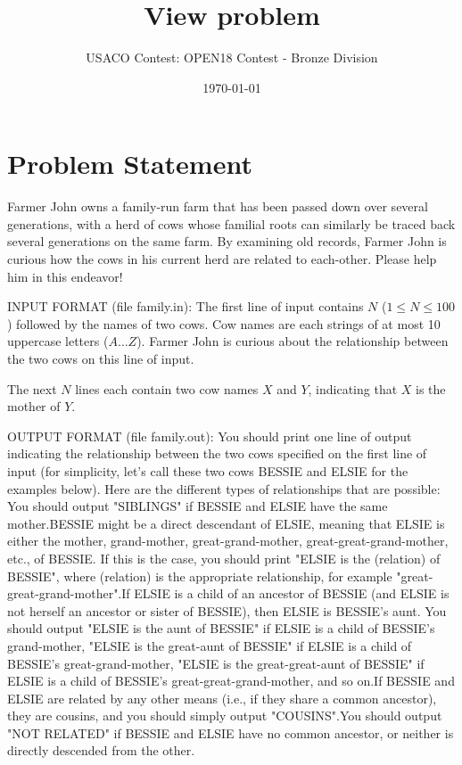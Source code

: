 \documentclass[12pt]{article}
\title{View problem}
\author{USACO Contest: OPEN18 Contest - Bronze Division}
\date{\today}
\begin{document}
\maketitle

\section*{Problem Statement}

Farmer John owns a family-run farm that has been passed down over several
generations, with a herd of cows whose familial roots can similarly be traced
back several generations on the same farm.  By examining old records, Farmer
John is curious how the cows in his current herd are related to each-other.
Please help him in this endeavor!

INPUT FORMAT (file family.in):
The first line of input contains $N$ ($1 \leq N \leq 100$) followed by the names
of two cows.  Cow names are each strings of at most 10 uppercase letters
($A \ldots Z$). Farmer John is curious about the relationship between the two
cows on this line of input.  

The next $N$ lines each contain two cow names $X$ and $Y$, indicating that $X$
is the mother of $Y$.  

OUTPUT FORMAT (file family.out):
You should print one line of output indicating the relationship between the two
cows specified on the first line of input (for simplicity, let's call these two
cows BESSIE and ELSIE for the examples below).  Here are the different types of
relationships that are possible:
You should output "SIBLINGS" if BESSIE and ELSIE have the same mother.BESSIE might be a direct descendant of ELSIE, meaning that ELSIE is either
the mother, grand-mother, great-grand-mother, great-great-grand-mother, etc., of
BESSIE. If this is the case, you should print "ELSIE is the (relation) of
BESSIE", where (relation) is the appropriate relationship, for example
"great-great-grand-mother".If ELSIE is a child of an ancestor of
BESSIE (and ELSIE is not herself an ancestor or sister of BESSIE), then ELSIE is BESSIE's aunt.
You should output "ELSIE is the aunt of
BESSIE" if ELSIE is a child of BESSIE's grand-mother, "ELSIE is the great-aunt
of BESSIE" if ELSIE is a child of BESSIE's great-grand-mother, "ELSIE is the
great-great-aunt of BESSIE" if ELSIE is a child of BESSIE's
great-great-grand-mother, and so on.If BESSIE and ELSIE are related by
any other means (i.e., if they share a common ancestor), they are cousins, and
you should simply output "COUSINS".You should output "NOT RELATED" if
BESSIE and ELSIE have no common ancestor, or neither is directly descended from
the other.
\end{document}
